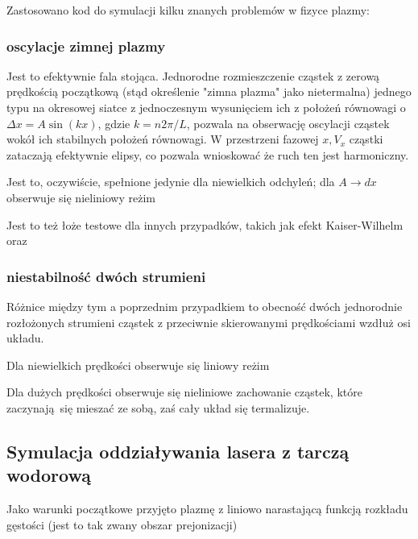     Zastosowano kod do symulacji kilku znanych problemów w fizyce plazmy:
    \subsubsection{oscylacje zimnej plazmy}
    Jest to efektywnie fala stojąca. Jednorodne rozmieszczenie cząstek z zerową
    prędkością początkową (stąd określenie "zimna plazma" jako nietermalna)
     jednego typu na okresowej siatce z jednoczesnym wysunięciem
    ich z położeń równowagi o $\Delta x = A \sin(kx)$, gdzie $k = n 2 \pi / L$,
    pozwala na obserwację oscylacji cząstek wokół ich stabilnych położeń
    równowagi. W przestrzeni fazowej $x, V_x$ cząstki zataczają efektywnie
    elipsy, co pozwala wnioskować że ruch ten jest harmoniczny.

    Jest to, oczywiście, spełnione jedynie dla niewielkich odchyleń; dla $A \to
    dx$  obserwuje się nieliniowy reżim 

    Jest to też łoże testowe  dla innych
    przypadków, takich jak efekt Kaiser-Wilhelm
    oraz 
    \subsubsection{niestabilność dwóch strumieni}
    Różnice między tym a poprzednim przypadkiem to obecność dwóch jednorodnie
    rozłożonych strumieni cząstek z przeciwnie skierowanymi prędkościami wzdłuż
    osi układu.

    Dla niewielkich prędkości  obserwuje się
    liniowy reżim 

    Dla dużych prędkości  obserwuje się nieliniowe
    zachowanie cząstek, które zaczynają się mieszać ze sobą, zaś cały układ się
    termalizuje.
    \subsection{Symulacja oddziaływania lasera z tarczą wodorową}

    Jako warunki początkowe przyjęto plazmę z liniowo narastającą funkcją
    rozkładu gęstości (jest to tak zwany obszar prejonizacji)

